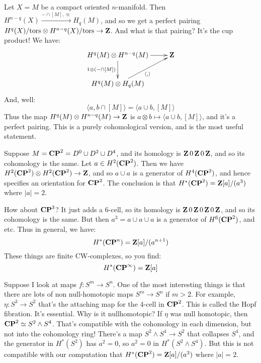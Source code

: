 Let $X=M$ be a compact oriented $n$-manifold. Then $H^{n-q}(X)\xrightarrow{-\cap[M],\cong}H_q(M)$, and so we get a perfect pairing $H^q(X)/\mathrm{tors}\otimes H^{n-q}(X)/\mathrm{tors}\to\mathbf Z$. And what is that pairing? It's the cup product! We have:
\begin{equation*}
\xymatrix{
	H^q(M)\otimes H^{n-q}(M)\ar[r]\ar[d]_{1\otimes(-\cap [M])} & \Z\\
	H^q(M)\otimes H_q(M)\ar[ur]_{\langle,\rangle}
}
\end{equation*}
And, well:
\begin{equation*}
\langle a,b\cap [M]\rangle = \langle a\cup b,[M]\rangle
\end{equation*}
Thus the map $H^q(M)\otimes H^{n-q}(M)\to \mathbf Z$ is $a\otimes b\mapsto\langle a\cup b,[M]\rangle$, and it's a perfect pairing. This is a purely cohomological version, and is the most useful statement.
\begin{example}
Suppose $M=\mathbf{CP}^2=D^0\cup D^2\cup D^4$, and its homology is $\mathbf Z \, 0 \, \mathbf Z \, 0\, \mathbf Z$, and so its cohomology is the same. Let $a\in H^2(\mathbf{CP}^2)$. Then we have $H^2(\mathbf{CP}^2)\otimes H^2(\mathbf{CP}^2)\to \mathbf Z$, and so $a\cup a$ is a generator of $H^4(\mathbf{CP}^2)$, and hence specifies an orientation for $\mathbf{CP}^2$. The conclusion is that $H^\ast(\mathbf{CP}^2)=\mathbf Z[a]/(a^3)$ where $|a|=2$.

How about $\mathbf{CP}^3$? It just adds a $6$-cell, so its homology is $\mathbf Z \, 0 \, \mathbf Z \, 0\, \mathbf Z \, 0 \, \mathbf Z$, and so its cohomology is the same. But then $a^3=a\cup a\cup a$ is a generator of $H^6(\mathbf{CP}^2)$, and etc. Thus in general, we have:
$$H^\ast(\mathbf{CP}^n)=\mathbf Z[a]/(a^{n+1})$$
These things are finite CW-complexes, so you find:
\begin{equation}
H^\ast(\mathbf{CP}^\infty)=\mathbf Z[a]
\end{equation}
\end{example}
\begin{example}
Suppose I look at maps $f:S^m\to S^n$. One of the most interesting things is that there are lots of non null-homotopic maps $S^m\to S^n$ if $m>2$. For example, $\eta:S^3\to S^2$ that's the attaching map for the $4$-cell in $\mathbf{CP}^2$. This is called the Hopf fibration. It's essential. Why is it nullhomotopic? If $\eta$ was null homotopic, then $\mathbf{CP}^2\simeq S^2\wedge S^4$. That's compatible with the cohomology in each dimension, but not into the cohomology ring! There's a map $S^2\wedge S^4\to S^2$ that collapses $S^4$, and the generator in $H^\ast(S^2)$ has $a^2=0$, so $a^2=0$ in $H^\ast(S^2\wedge S^4)$. But this is not compatible with our computation that $H^\ast(\mathbf{CP}^2)=\mathbf Z[a]/(a^3)$ where $|a|=2$.
\end{example}


